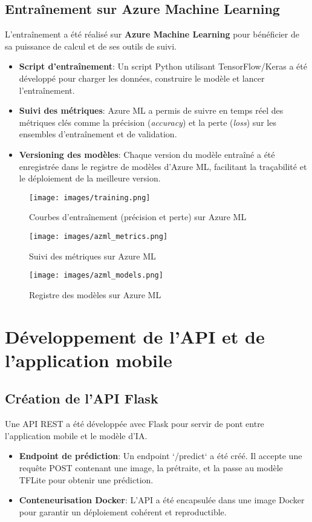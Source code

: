 \documentclass[12pt,a4paper]{report}
\begin{document}
\subsection{Entraînement sur Azure Machine Learning}
L’entraînement a été réalisé sur \textbf{Azure Machine Learning} pour bénéficier de sa puissance de calcul et de ses outils de suivi.
\begin{itemize}
    \item \textbf{Script d’entraînement}: Un script Python utilisant TensorFlow/Keras a été développé pour charger les données, construire le modèle et lancer l’entraînement.
    \item \textbf{Suivi des métriques}: Azure ML a permis de suivre en temps réel des métriques clés comme la précision (\textit{accuracy}) et la perte (\textit{loss}) sur les ensembles d’entraînement et de validation.
    \item \textbf{Versioning des modèles}: Chaque version du modèle entraîné a été enregistrée dans le registre de modèles d’Azure ML, facilitant la traçabilité et le déploiement de la meilleure version.
\end{itemize}

\begin{figure}[H]
    \centering
    \texttt{[image: images/training.png]}
    \caption{Courbes d’entraînement (précision et perte) sur Azure ML}
\end{figure}

\begin{figure}[H]
    \centering
    \texttt{[image: images/azml\_metrics.png]}
    \caption{Suivi des métriques sur Azure ML}
\end{figure}

\begin{figure}[H]
    \centering
    \texttt{[image: images/azml\_models.png]}
    \caption{Registre des modèles sur Azure ML}
\end{figure}

\section{Développement de l’API et de l’application mobile}

\subsection{Création de l’API Flask}
Une API REST a été développée avec Flask pour servir de pont entre l’application mobile et le modèle d’IA.\@
\begin{itemize}
    \item \textbf{Endpoint de prédiction}: Un endpoint `/predict` a été créé. Il accepte une requête POST contenant une image, la prétraite, et la passe au modèle TFLite pour obtenir une prédiction.
    \item \textbf{Conteneurisation Docker}: L’API a été encapsulée dans une image Docker pour garantir un déploiement cohérent et reproductible.
\end{itemize}
\end{document}

